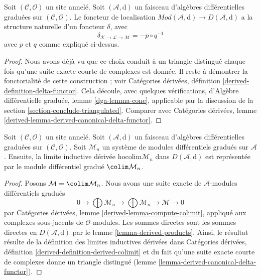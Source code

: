 \begin{lemma}
\label{lemma-derived-canonical-delta-functor}
Soit $(\mathcal{C}, \mathcal{O})$ un site annelé. Soit
$(\mathcal{A}, \text{d})$ un faisceau d'algèbres différentielles graduées
sur $(\mathcal{C}, \mathcal{O})$. Le foncteur de localisation
$\textit{Mod}(\mathcal{A}, \text{d}) \to D(\mathcal{A}, \text{d})$ a
la structure naturelle d'un foncteur $\delta$, avec
$$
\delta_{\mathcal{K} \to \mathcal{L} \to \mathcal{M}} = - p \circ q^{-1}
$$ avec
$p$ et $q$ comme expliqué ci-dessus.
\end{lemma}

\begin{proof}
Nous avons déjà vu que ce choix conduit à un triangle distingué
chaque fois qu'une suite exacte courte de complexes est donnée. Il
reste à démontrer la fonctorialité de cette construction ;
voir Catégories dérivées, définition \ref{derived-definition-delta-functor}.
Cela découle, avec quelques vérifications, d'Algèbre différentielle graduée, lemme \ref{dga-lemma-cone},
applicable
par la discussion de la section \ref{section-conclude-triangulated}.
Comparer avec
Catégories dérivées, lemme \ref{derived-lemma-derived-canonical-delta-functor}.
\end{proof}

\begin{lemma}
\label{lemma-homotopy-colimit}
Soit $(\mathcal{C}, \mathcal{O})$ un site annelé. Soit
$(\mathcal{A}, \text{d})$ un faisceau d'algèbres différentielles graduées sur
$(\mathcal{C}, \mathcal{O})$. Soit
$\mathcal{M}_n$ un système de modules différentiels gradués sur $\mathcal{A}$.
Ensuite, la limite inductive dérivée $\text{hocolim} \mathcal{M}_n$
dans $D(\mathcal{A}, \text{d})$ est représentée
par le module différentiel gradué $\colim \mathcal{M}_n$.
\end{lemma}

\begin{proof}
Posons $\mathcal{M} = \colim \mathcal{M}_n$.
Nous avons une suite exacte de $\mathcal{A}$-modules différentiels gradués
$$
0 \to \bigoplus \mathcal{M}_n \to \bigoplus \mathcal{M}_n \to \mathcal{M} \to 0
$$
par Catégories dérivées, lemme \ref{derived-lemma-compute-colimit},
appliqué aux complexes sous-jacents de $\mathcal{O}$-modules. Les
sommes directes sont les sommes directes en $D(\mathcal{A}, \text{d})$
par le lemme \ref{lemma-derived-products}.
Ainsi, le résultat résulte de la
définition des limites inductives dérivées dans Catégories
dérivées, définition \ref{derived-definition-derived-colimit}
et du fait qu'une suite exacte courte de
complexes donne un triangle distingué
(lemme \ref{lemma-derived-canonical-delta-functor}).
\end{proof}






